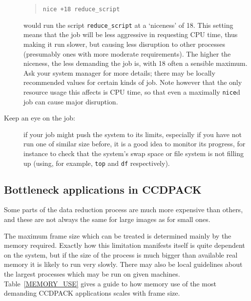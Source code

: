 \documentclass[twoside,11pt]{article}
\newcommand{\xlabel}[1]{}
\begin{document}
\begin{description}
  \begin{quote}
   {\tt nice +18 reduce\_script}
  \end{quote}

   would run the script {\tt reduce\_script} at a `niceness' of 18.
   This setting means that the job will be less aggressive in requesting
   CPU time, thus making it run slower, but causing less disruption to
   other processes (presumably ones with more moderate requirements).
   The higher the niceness, the less demanding the job is, with 18 often a
   sensible maximum.
   Ask your system manager for more details; there may be locally
   recommended values for certain kinds of job.
   Note however that the only resource usage this affects is CPU time,
   so that even a maximally {\tt nice}d job can cause major disruption.

  \item[Keep an eye on the job:] if your job might push the system to its
   limits, especially if you have not run one of similar size before,
   it is a good idea to monitor its progress, for instance to check that
   the system's swap space or file system is not filling up
   (using, for example, {\tt top} and {\tt df} respectively).

\end{description}

\subsection{\xlabel{LARGE-APPS}Bottleneck applications in CCDPACK}

Some parts of the data reduction process are much
more expensive than others,
and these are not always the same for large images as for small ones.

The maximum frame size which can be treated is
determined mainly by the memory required.
Exactly how this limitation manifests itself is quite
dependent on the system, but if the size of the process is
much bigger than available real memory it is likely to run very slowly.
There may also be local guidelines about the largest processes
which may be run on given machines.
Table~\ref{MEMORY_USE} gives a guide to how memory use of the most demanding
CCDPACK applications scales with frame size.
\end{document}
